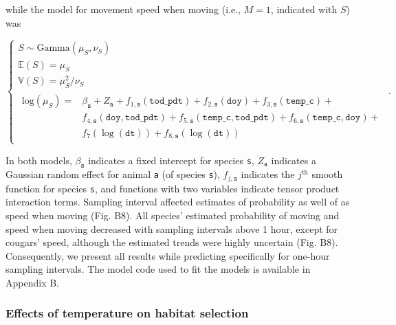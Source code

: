 \documentclass[
  12pt,
]{article}
\begin{document}
\noindent while the model for movement speed when moving (i.e., \(M = 1\), indicated with \(S\)) was

\begin{equation}\label{eq:speed-model}
\begin{cases}
S \sim \text{Gamma}(\mu_S, \nu_S) \\
\mathbb E(S) = \mu_S \\
\mathbb V(S) = \mu_S^2 / \nu_S \\
\begin{aligned}
\text{log}(\mu_S) = & \beta_\texttt{s} + Z_\texttt{a} + f_{1,\texttt{s}}(\texttt{tod\_pdt}) + f_{2,\texttt s}(\texttt{doy}) + f_{3,\texttt s}(\texttt{temp\_c}) + \\
& f_{4,\texttt s}(\texttt{doy}, \texttt{tod\_pdt}) + f_{5, \texttt s}(\texttt{temp\_c}, \texttt{tod\_pdt}) + f_{6, \texttt s}(\texttt{temp\_c}, \texttt{doy}) + \\
& f_7(\log(\texttt{dt})) + f_{8,\texttt s}(\log(\texttt{dt}))
\end{aligned}
\end{cases}.
\end{equation}

\noindent In both models, \(\beta_\texttt{s}\) indicates a fixed intercept for species \texttt{s}, \(Z_\texttt a\) indicates a Gaussian random effect for animal \texttt{a} (of species \texttt{s}), \(f_{j,\texttt{s}}\) indicates the \(j^{\text{th}}\) smooth function for species \texttt{s}, and functions with two variables indicate tensor product interaction terms. Sampling interval affected estimates of probability as well of as speed when moving (Fig. B8). All species' estimated probability of moving and speed when moving decreased with sampling intervals above 1 hour, except for cougars' speed, although the estimated trends were highly uncertain (Fig. B8). Consequently, we present all results while predicting specifically for one-hour sampling intervals. The model code used to fit the models is available in Appendix B.

\subsubsection{Effects of temperature on habitat selection}\label{effects-of-temperature-on-habitat-selection}
\end{document}
